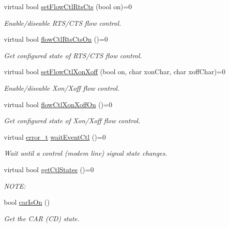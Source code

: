 \begin{DoxyCompactItemize}
virtual bool \hyperlink{classmdt_abstract_serial_port_af01806f53cfc5ef90b34c0645cee3bdf}{set\-Flow\-Ctl\-Rts\-Cts} (bool on)=0
\begin{DoxyCompactList}\small\item\em Enable/diseable R\-T\-S/\-C\-T\-S flow control. \end{DoxyCompactList}\item 
virtual bool \hyperlink{classmdt_abstract_serial_port_a7a1163b4d44d80369bd56c65af7942ad}{flow\-Ctl\-Rts\-Cts\-On} ()=0
\begin{DoxyCompactList}\small\item\em Get configured state of R\-T\-S/\-C\-T\-S flow control. \end{DoxyCompactList}\item 
virtual bool \hyperlink{classmdt_abstract_serial_port_a05b35143f7b048ebcb2295fdc2ac5013}{set\-Flow\-Ctl\-Xon\-Xoff} (bool on, char xon\-Char, char xoff\-Char)=0
\begin{DoxyCompactList}\small\item\em Enable/diseable Xon/\-Xoff flow control. \end{DoxyCompactList}\item 
virtual bool \hyperlink{classmdt_abstract_serial_port_a80074ba4e5bf44c3e2aebb82214499ee}{flow\-Ctl\-Xon\-Xoff\-On} ()=0
\begin{DoxyCompactList}\small\item\em Get configured state of Xon/\-Xoff flow control. \end{DoxyCompactList}\item 
virtual \hyperlink{classmdt_abstract_port_ad4121bb930c95887e77f8bafa065a85e}{error\-\_\-t} \hyperlink{classmdt_abstract_serial_port_a146bf17f4f11c173e9b123bace0f2ddf}{wait\-Event\-Ctl} ()=0
\begin{DoxyCompactList}\small\item\em Wait until a control (modem line) signal state changes. \end{DoxyCompactList}\item 
virtual bool \hyperlink{classmdt_abstract_serial_port_aaeacd26b220ab0f8c521cef74edfafdd}{get\-Ctl\-States} ()=0
\begin{DoxyCompactList}\small\item\em N\-O\-T\-E\-: \end{DoxyCompactList}\item 
bool \hyperlink{classmdt_abstract_serial_port_abf0be424c1a8cf01b830cc6b371e8695}{car\-Is\-On} ()
\begin{DoxyCompactList}\small\item\em Get the C\-A\-R (C\-D) state. \end{DoxyCompactList}\item 

\end{DoxyCompactItemize}
